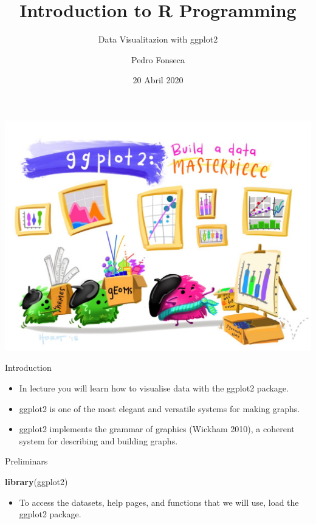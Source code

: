 \documentclass[ignorenonframetext,]{beamer}
\title{Introduction to R Programming}
\subtitle{Data Visualitazion with ggplot2}
\author{Pedro Fonseca}
\date{20 Abril 2020}
\newenvironment{Shaded}{\begin{snugshade}}{\end{snugshade}}
\newcommand{\KeywordTok}[1]{\textcolor[rgb]{0.13,0.29,0.53}{\textbf{#1}}}
\newcommand{\NormalTok}[1]{#1}
\providecommand{\tightlist}{%
  \setlength{\itemsep}{0pt}\setlength{\parskip}{0pt}}
\begin{document}
\frame{\titlepage}

\begin{frame}

\includegraphics{pic.png}

\end{frame}

\begin{frame}{Introduction}
\protect\hypertarget{introduction}{}

\begin{itemize}
\item
  In lecture you will learn how to visualise data with the ggplot2
  package.
\item
  ggplot2 is one of the most elegant and versatile systems for making
  graphs.
\item
  ggplot2 implements the grammar of graphics (Wickham 2010), a coherent
  system for describing and building graphs.
\end{itemize}

\end{frame}

\begin{frame}[fragile]{Preliminars}
\protect\hypertarget{preliminars}{}

\begin{Shaded}
\begin{Highlighting}[]
\KeywordTok{library}\NormalTok{(ggplot2)}
\end{Highlighting}
\end{Shaded}

\begin{itemize}
\tightlist
\item
  To access the datasets, help pages, and functions that we will use,
  load the ggplot2 package.
\end{itemize}

\end{frame}
\end{document}
